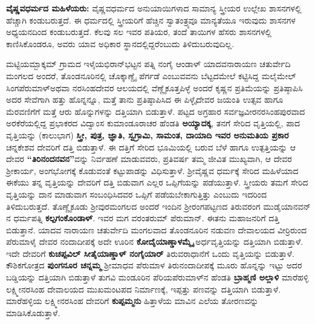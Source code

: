 \textbf{ವೈಷ್ಣವಧರ್ಮದ ಮಹಿಳೆಯರು:} ವೈಷ್ಣವಧರ್ಮದ ಅನುಯಾಯಿಗಳಾದ ಸಾಮಾನ್ಯ ಸ್ತ್ರೀಯರ ಉಲ್ಲೇಖ ಶಾಸನಗಳಲ್ಲಿ ಹೆಚ್ಚಾಗಿ ಕಂಡುಬರುತ್ತದೆ. ಈ ಧರ್ಮದಲ್ಲಿ ಸ್ತ್ರೀಯರಿಗೆ ಹೆಚ್ಚಿನ ಸ್ವಾತಂತ್ರ್ಯವೂ ಮಾನ್ಯತೆಯೂ ಇರುವುದು ಶಾಸನಗಳ ಅಧ್ಯಯನದಿಂದ ಕಂಡುಬರುತ್ತದೆ. ಕೆಲವು ಸಲ ಇವರ ಪತಿಯರ, ತಂದೆ ತಾಯಿಗಳ ಹೆಸರು ಶಾಸನಗಳಲ್ಲಿ ಕಾಣಿಸಿ\-ಕೊಂಡರೂ, ಅವರು ಯಾವ ಅಧಿಕಾರ ಸ್ಥಾನದಲ್ಲಿದ್ದರೆಂಬುದು ತಿಳಿದುಬರುವುದಿಲ್ಲ.

ಮಟ್ಟಿಯಮ್ಬಾಕ್ಕಮ್ ಗ್ರಾಮದ ಇಳೈಯಭಿರಾನ್​ಭಟ್ಟನ ಪತ್ನಿ ನಂಗೈ ಆಂಡಾಳ್​ ಯಾದವನಾರಾಯಣ ಚತುರ್ವೇದಿ ಮಂಗಲದ ಅಂದರೆ, ತೊಂಡನೂರಿನಲ್ಲಿ ಚೊಕ್ಕಾಣ್ಡೈ ಪೆರ್ಗಡೆ ಎಂಬುವವನು ಬೆಟ್ಟದಮೇಲೆ ಕಟ್ಟಿಸಿದ್ದ ಮಲೈಮೇಲ್​\break ಸಿಂಗಪೆರುಮಾಳ್​ ಅಥವಾ ನರಸಿಂಹದೇವರ ಆಲಯದಲ್ಲಿ ವೆಣ್ಣೈಕೂತ್ತಪಿಳ್ಳೆ ಅಂದರೆ ಕೃಷ್ಣನ ಪ್ರತಿಮೆಯನ್ನು ಪ್ರತಿಷ್ಠಾಪಿಸಿ ಅದರ ಸೇವೆಗಾಗಿ ಹತ್ತು ಹೊನ್ನನ್ನೂ, ಮತ್ತೆ ತಾನು ಪ್ರತಿಷ್ಠಾಪಿಸಿದ ಈ ಪಿಳ್ಳೈದೇವರ ಜಯಂತಿ ಉತ್ಸವ ಹಾಗೂ ಮೆರವಣಿಗೆಗೆ ಮತ್ತೆ ಆರು ಹೊನ್ನುಗಳನ್ನು ದತ್ತಿಯಾಗಿ ಬಿಡುತ್ತಾಳೆ. ಪಟ್ಟದ ಅಗ್ರಹಾರ ಸರ್ವಜ್ಞವೀರನರಸಿಂಹಪುರವಾದ ಅರಕೆರೆಯಲ್ಲಿದ್ದ ಪ್ರಭಾಕರದ ವಿದ್ವಾಂಸ ಕುಮಾಂಡೂರಾಚರ ಹೆಂಡತಿ \textbf{ಅಯ್ಯಾದಕ್ಕ}, ತನಗೆ ಸೇರಿದ ವೃತ್ತಿಯಲ್ಲಿ, ಪಾದ ವೃತ್ತಿಯನ್ನು (ಕಾಲುಭಾಗ) \textbf{ಸ್ತ್ರೀ, ಪುತ್ರ, ಜ್ಞಾತಿ, ಸ್ವಗ್ರಾಮಿ, ಸಾಮಂತ, ದಾಯಾದಿ ಇವರ ಅನುಮತಿಯ ಪ್ರಕಾರ} ಚನ್ನಕೇಶವ ದೇವರಿಗೆ ದತ್ತಿ ಬಿಡುತ್ತಾಳೆ. ಈ ದತ್ತಿಗೆ ಸೇರಿದ ಭೂಮಿಯಲ್ಲಿ ಬರುವ ಬೆಳೆ ಹಾಗೂ ಉತ್ಪತ್ತಿಯನ್ನು ಆ ದೇವರ \textbf{“ತಿರಿನಂದನವನ”}ವನ್ನು ನಿರ್ವಹಣೆ ಮಾಡುವವರು, ಪ್ರತಿವರ್ಷ ತಮ್ಮ ಜೀವಿತ ಮುಖ್ಯವಾಗಿ, ಆ ದೇವರ ಶ‍್ರೀಕಾರ್ಯ, ಅಂಗಭೋಗಕ್ಕೆ ಕೊಡುವಂತೆ ಕಟ್ಟುಪಾಡನ್ನು ವಿಧಿಸುತ್ತಾಳೆ. ಶ‍್ರೀವೈಷ್ಣವ ಧರ್ಮಕ್ಕೆ ಸೇರಿದ ಮಹಿಳೆಯಾದ ಈಕೆಯು ತನ್ನ ವೃತ್ತಿಯನ್ನು ದೇವರಿಗೆ ದತ್ತಿ ಬಿಡುವಾಗ ಎಲ್ಲರ ಒಪ್ಪಿಗೆಯನ್ನು ಪಡೆಯುತ್ತಾಳೆ. ಸ್ತ್ರೀಯರು ತಮಗೆ ಸೇರಿದ ವೃತ್ತಿಯನ್ನು ದಾನ ಮಾಡುವಾಗ ಸಂಬಂಧಿಸಿದವರ ಒಪ್ಪಿಗೆ ಪಡೆಯಬೇಕಾಗುತ್ತಿತ್ತು ಎಂಬುದು ಇದರಿಂದ ತಿಳಿದುಬರುತ್ತದೆ. ತೊಣ್ಣೈಕೂಡು ಶ‍್ರೀವುರಮಂಗಲದ ಅಂದರೆ ಇಂದಿನ ಶ‍್ರೀರಂಗಪಟ್ಟಣದ ತಿರುವರಂಗ ಮುಡೈಯಾನವನ್​ನ ಧರ್ಮಪತ್ನಿ \textbf{ಕಲ್ಪಗಂಕೊಂಡಾಳ್​}. ಇವರ ಮಗ ವರಂತರುಮ್ ಪೆರುಮಾನ್​. ಈತನು ಮಹಾಜನರಿಗೆ ದತ್ತಿ ಬಿಡುತ್ತಾನೆ. ಯಾದವ ನಾರಾಯಣ ಚತುರ್ವೇದಿ ಮಂಗಲವಾದ ತೊಂಡನೂರಿನ ನಡುವಣ ದೇವಾಲಯದ ವೀರ್ರಿರುಂದ ಪೆರುಮಾಳೈ ದೇವರ ನಂದಾದೀಪಕ್ಕೆ ಅದೇ ಊರಿನ \textbf{ಕೋದೈಯಾಣ್ಡಾಳಮ್ಮೈ} ಅರ್ಧವೃತ್ತಿಯನ್ನು ದತ್ತಿಯಾಗಿ ಬಿಡುತ್ತಾಳೆ. ಇದೇ ದೇವರಿಗೆ \textbf{ಕುಚಪ್ಪವಿಲ್​ ಸೀತೈಯಾಣ್ಡಾಳ್​ ನಂಗೈಯಾರ್​} ತಿರುವರಾಧಾನೆಗೆ ಒಂದು ವೃತ್ತಿಯನ್ನು ಬಿಡುತ್ತಾಳೆ. ಕೌಶಿಕಗೋತ್ರದ \textbf{ಪುಂಗನೂರ ಚನ್ನಮ್ಮ} ಶ‍್ರೀಮಾಧವ ಪೆರುಮಾಳ ತಿರುನಂದಾದೀಪಕ್ಕೆ ಮೂರು ಹೊನ್ನನ್ನು ಇಟ್ಟು ಅದರ ಬಡ್ಡಿಯನ್ನು ದತ್ತಿಯಾಗಿ ಬಿಡುತ್ತಾಳೆ ತುಗವಿ ಮಂಡೂರಿನ ಪೆರಿಯಪೆರುಮಾಳ್​ನ ಹೆಂಡತಿ \textbf{ಬ್ರಾಹ್ಮಣಿ ಅಲ್ಲಾಳಿ} ಮಾರೆಹಳ್ಳಿ ಲಕ್ಷ್ಮೀನರಸಿಂಹ ದೇವಾಲಯದ ಮುಖಮಂಟಪದ ನಿರ್ಮಾಣಕ್ಕೆ, ಇಪ್ಪತ್ತು ಪಣವನ್ನು ದತ್ತಿಯಾಗಿ ಬಿಡುತ್ತಾಳೆ. ಮಾರೆಹಳ್ಳಿಯ ಲಕ್ಷ್ಮೀನರಸಿಂಹ ದೇವರಿಗೆ \textbf{ಕುಪ್ಪಮ್ಮನು} ಹಿತ್ತಾಳೆಯ ಮಾವಿನ ಎಲೆಯ ತೋರಣವನ್ನು ಮಾಡಿಸಿಕೊಡುತ್ತಾಳೆ.

